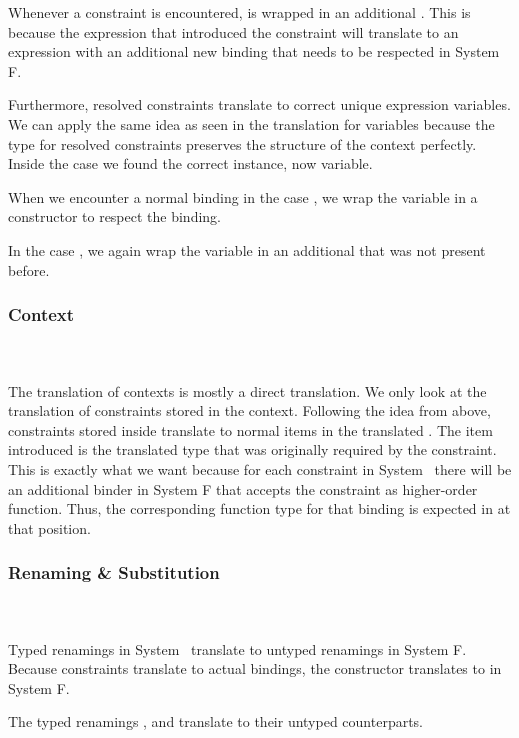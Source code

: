 \noindent Whenever a constraint is encountered,  is wrapped in an additional . 
This is because the expression that introduced the constraint will translate to an expression with an additional new binding that needs to be respected in System F.

\noindent Furthermore, resolved constraints translate to correct unique expression variables. We can apply the same idea as seen in the translation for variables because the type for resolved constraints \Data{[}  \Data{]∈}  preserves the structure of the context perfectly. 
\DPTOVar
Inside the case  we found the correct instance, now variable.

\noindent When we encounter a normal binding in the case , we wrap the variable in a  constructor to respect the binding.

\noindent In the case , we again wrap the variable in an additional  that was not present before.
\subsubsection{Context}\hfill\\\\
The translation of contexts is mostly a direct translation. 
We only look at the translation of constraints stored in the context.
\DPTCtx
Following the idea from above, constraints  \Constr{:}  stored inside  translate to normal items in the translated . 
The item introduced is the translated type   that was originally required by the constraint. 
This is exactly what we want because for each constraint in System \Fo\ there will be an additional binder in System F that accepts the constraint as higher-order function. 
Thus, the corresponding function type for that binding is expected in  at that position.

\subsubsection{Renaming \& Substitution}\hfill\\\\
Typed renamings in System \Fo\ translate to untyped renamings in System F.
\DPTRen
\noindent Because constraints translate to actual bindings, the constructor  translates to  in System F.

\noindent The typed renamings ,  and  translate to their untyped counterparts. 

